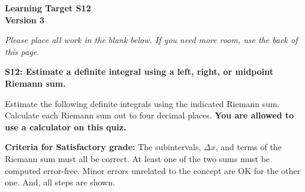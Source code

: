 \documentclass[10pt]{article}
\begin{document}
	\vspace*{0in}

		\begin{center}
			\textbf{Learning Target S12 \\
			Version 3} \\
		\end{center}

\emph{Please place all work in the blank below. If you need more room, use the back of this page.}

\begin{framed}
	\textbf{\textbf{S12:} Estimate a definite integral using a left, right, or midpoint Riemann sum.}
\end{framed}

Estimate the following definite integrals using the indicated Riemann sum. Calculate each Riemann sum out to four decimal places. \textbf{You are allowed to use a calculator on this quiz.}

\begin{enumerate}
    \item $\displaystyle{\int_0^3 (x^3 - 6x) \, dx$ using a right Riemann sum with $n = 3$
    \item $\displaystyle{\int_2^5 \sqrt{x} \, dx$ using a middle Riemann sum with $n = 3$
\end{enumerate}

\vfill


\begin{small}
    \begin{framed}
        	\textbf{Criteria for Satisfactory grade:} The subintervals, $\Delta x$, and terms of the Riemann sum must all be correct. At least one of the two sums must be computed error-free. Minor errors unrelated to the concept are OK for the other one. And, all steps are shown. 
    \end{framed}

\end{small}
\end{document}
